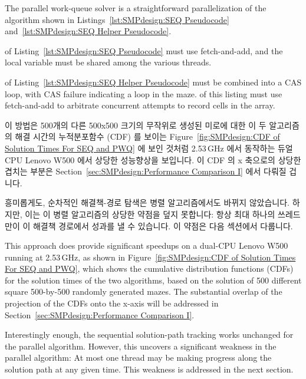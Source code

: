 The parallel work-queue solver is a straightforward parallelization
of the algorithm shown in
Listings~\ref{lst:SMPdesign:SEQ Pseudocode} and~\ref{lst:SMPdesign:SEQ Helper Pseudocode}.
\begin{fcvref}
 of Listing~\ref{lst:SMPdesign:SEQ Pseudocode} must use fetch-and-add,
and the local variable  must be shared among the various threads.
\end{fcvref}
\begin{fcvref}
 of Listing~\ref{lst:SMPdesign:SEQ Helper Pseudocode} must be
combined into a CAS loop, with CAS failure indicating a loop in the
maze.
 of this listing must use
fetch-and-add to arbitrate concurrent
attempts to record cells in the  array.
\end{fcvref}

\fi

이 방법은 500개의 다른 500x500 크기의 무작위로 생성된 미로에 대한 이 두
알고리즘의 해결 시간의 누적분포함수 (CDF) 를 보이는
Figure~\ref{fig:SMPdesign:CDF of Solution Times For SEQ and PWQ} 에 보인 것처럼
2.53\,GHz 에서 동작하는 듀얼 CPU Lenovo W500 에서 상당한 성능향상을 보입니다.
이 CDF 의 x 축으로의 상당한 겹치는 부분은
Section~\ref{sec:SMPdesign:Performance Comparison I} 에서 다뤄질 겁니다.

흥미롭게도, 순차적인 해결책-경로 탐색은 병렬 알고리즘에서도 바뀌지 않았습니다.
하지만, 이는 이 병렬 알고리즘의 상당한 약점을 덮지 못합니다:
항상 최대 하나의 쓰레드만이 이 해결책 경로에서 성과를 낼 수 있습니다.
이 약점은 다음 섹션에서 다룹니다.

\iffalse

This approach does provide significant speedups on a dual-CPU
Lenovo W500 running at 2.53\,GHz, as shown in
Figure~\ref{fig:SMPdesign:CDF of Solution Times For SEQ and PWQ},
which shows the cumulative distribution functions (CDFs) for the solution
times of the two algorithms, based on the solution of 500 different square
500-by-500 randomly generated mazes.
The substantial overlap
of the projection of the CDFs onto the x-axis will be addressed in
Section~\ref{sec:SMPdesign:Performance Comparison I}.

Interestingly enough, the sequential solution-path tracking works unchanged
for the parallel algorithm.
However, this uncovers a significant weakness in the parallel algorithm:
At most one thread may be making progress along the solution path at
any given time.
This weakness is addressed in the next section.

